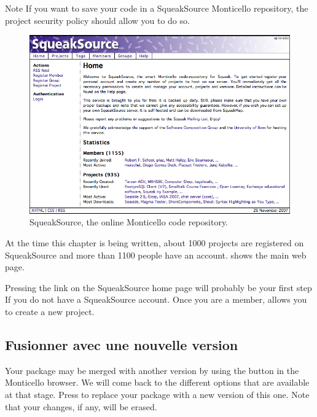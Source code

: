 \documentclass[a4paper,10pt,twoside]{book}
\begin{document}
Note If you want to save your code in a SqueakSource Monticello repository, the project security policy should allow you to do so.


\begin{figure}[ht]\centering
	\includegraphics[width=.75\linewidth]{squeaksource2}
	\caption{SqueakSource, the online Monticello code repository.}
\end{figure}

At the time this chapter is being written, about 1000 projects are registered on SqueakSource and more than 1100 people have an account.  shows the main web page.  

Pressing the  link on the SqueakSource home page will probably be your first step If you do not have a SqueakSource account. 
Once you are a member,  allows you to create a new project. 

\subsection{Fusionner avec une nouvelle version} %

Your package may be merged with another version by using the  button in the Monticello browser. We will come back to the different options that are available at that stage. Press  to replace your package with a new version of this one. Note that your changes, if any, will be erased.
\end{document}
